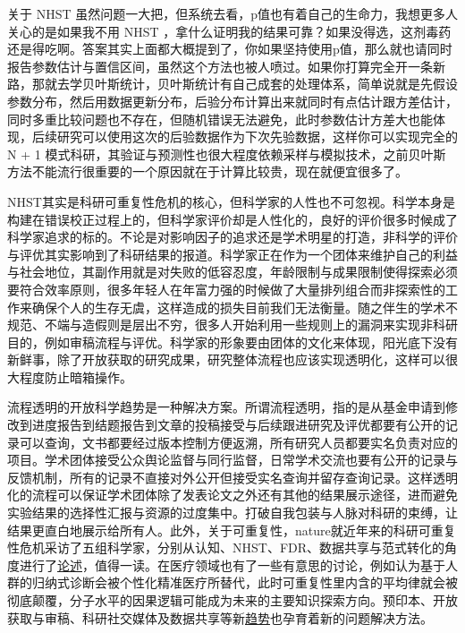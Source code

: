 \documentclass[]{tufte-book}
\begin{document}
关于 NHST 虽然问题一大把，但系统去看，p值也有着自己的生命力，我想更多人关心的是如果我不用 NHST ，拿什么证明我的结果可靠？如果没得选，这剂毒药还是得吃啊。答案其实上面都大概提到了，你如果坚持使用p值，那么就也请同时报告参数估计与置信区间，虽然这个方法也被人喷过。如果你打算完全开一条新路，那就去学贝叶斯统计，贝叶斯统计有自己成套的处理体系，简单说就是先假设参数分布，然后用数据更新分布，后验分布计算出来就同时有点估计跟方差估计，同时多重比较问题也不存在，但随机错误无法避免，此时参数估计方差大也能体现，后续研究可以使用这次的后验数据作为下次先验数据，这样你可以实现完全的 N + 1 模式科研，其验证与预测性也很大程度依赖采样与模拟技术，之前贝叶斯方法不能流行很重要的一个原因就在于计算比较贵，现在就便宜很多了。

NHST其实是科研可重复性危机的核心，但科学家的人性也不可忽视。科学本身是构建在错误校正过程上的，但科学家评价却是人性化的，良好的评价很多时候成了科学家追求的标的。不论是对影响因子的追求还是学术明星的打造，非科学的评价与评优其实影响到了科研结果的报道。科学家正在作为一个团体来维护自己的利益与社会地位，其副作用就是对失败的低容忍度，年龄限制与成果限制使得探索必须要符合效率原则，很多年轻人在年富力强的时候做了大量排列组合而非探索性的工作来确保个人的生存无虞，这样造成的损失目前我们无法衡量。随之伴生的学术不规范、不端与造假则是层出不穷，很多人开始利用一些规则上的漏洞来实现非科研目的，例如审稿流程与评优。科学家的形象要由团体的文化来体现，阳光底下没有新鲜事，除了开放获取的研究成果，研究整体流程也应该实现透明化，这样可以很大程度防止暗箱操作。

流程透明的开放科学趋势是一种解决方案。所谓流程透明，指的是从基金申请到修改到进度报告到结题报告到文章的投稿接受与后续跟进研究及评优都要有公开的记录可以查询，文书都要经过版本控制方便返溯，所有研究人员都要实名负责对应的项目。学术团体接受公众舆论监督与同行监督，日常学术交流也要有公开的记录与反馈机制，所有的记录不直接对外公开但接受实名查询并留存查询记录。这样透明化的流程可以保证学术团体除了发表论文之外还有其他的结果展示途径，进而避免实验结果的选择性汇报与资源的过度集中。打破自我包装与人脉对科研的束缚，让结果更直白地展示给所有人。此外，关于可重复性，nature就近年来的科研可重复性危机采访了五组科学家，分别从认知、NHST、FDR、数据共享与范式转化的角度进行了\href{https://www.nature.com/articles/d41586-017-07522-z}{论述}，值得一读。在医疗领域也有了一些有意思的讨论，例如认为基于人群的归纳式诊断会被个性化精准医疗所替代，此时可重复性里内含的平均律就会被彻底颠覆，分子水平的因果逻辑可能成为未来的主要知识探索方向。预印本、开放获取与审稿、科研社交媒体及数据共享等新\href{https://theoreticalecology.wordpress.com/2019/01/22/tree-species-richness-and-its-effects-on-productivity-neither-global-nor-consistent/}{趋势}也孕育着新的问题解决方法。
\end{document}
